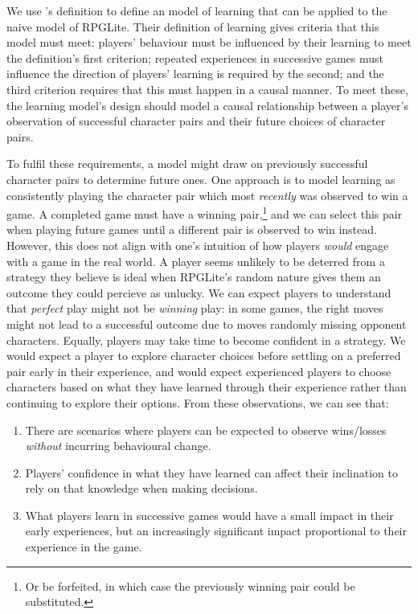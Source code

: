 
We use \citet{de2013learning}'s definition to define an \aspectoriented{} model
of learning that can be applied to the naive model of RPGLite. Their definition
of learning gives criteria that this model must meet: players' behaviour must be
influenced by their learning to meet the definition's first criterion; repeated
experiences in successive games must influence the direction of players'
learning is required by the second; and the third criterion requires that this
must happen in a causal manner. To meet these, the learning model's design
should model a causal relationship between a player's observation of successful
character pairs and their future choices of character pairs.

To fulfil these requirements, a model might draw on previously successful
character pairs to determine future ones. One approach is to model learning as
consistently playing the character pair which most \emph{recently} was observed
to win a game. A completed game must have a winning pair,\footnote{Or be
forfeited, in which case the previously winning pair could be substituted.} and
we can select this pair when playing future games until a different pair is
observed to win instead. However, this does not align with one's intuition of
how players \emph{would} engage with a game in the real world. A player seems
unlikely to be deterred from a strategy they believe is ideal when RPGLite's
random nature gives them an outcome they could percieve as unlucky. We can
expect players to understand that \emph{perfect} play might not be
\emph{winning} play: in some games, the right moves might not lead to a
successful outcome due to moves randomly missing opponent characters. Equally,
players may take time to become confident in a strategy. We would expect a
player to explore character choices before settling on a preferred pair early in
their experience, and would expect experienced players to choose characters
based on what they have learned through their experience rather
than continuing to explore their options. From these observations, we can see that:

\begin{enumerate}
  \item There are scenarios where players can be expected to observe wins/losses
  \emph{without} incurring behavioural change.
  \item Players' confidence in what they have learned can affect their
  inclination to rely on that knowledge when making decisions.
  \item What players learn in successive games would have a small impact in
  their early experiences, but an increasingly significant impact proportional
  to their experience in the game.
\end{enumerate}

